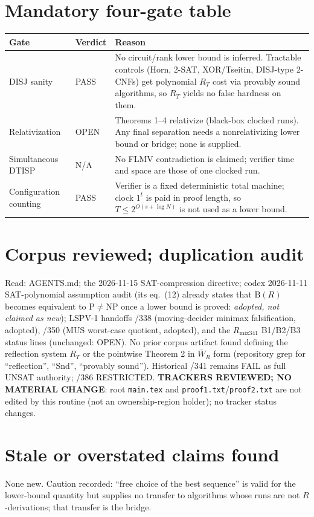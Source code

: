 \documentclass[11pt]{article}
\theoremstyle{definition}
\newcommand{\Wbar}{\overline W}
\begin{document}
\section{Mandatory four-gate table}
\begin{tabular}{p{3.2cm}p{1.6cm}p{9cm}}
\toprule
Gate & Verdict & Reason\\\midrule
DISJ sanity & PASS & No circuit/rank lower bound is inferred. Tractable controls
(Horn, 2-SAT, XOR/Tseitin, DISJ-type 2-CNFs) get polynomial $R_T$ cost via provably
sound algorithms, so $R_T$ yields no false hardness on them.\\
Relativization & OPEN & Theorems 1--4 relativize (black-box clocked runs). Any final
separation needs a nonrelativizing lower bound or bridge; none is supplied.\\
Simultaneous DTISP & N/A & No FLMV contradiction is claimed; verifier time and space
are those of one clocked run.\\
Configuration counting & PASS & Verifier is a fixed deterministic total machine;
clock $1^t$ is paid in proof length, so $T\le 2^{O(s+\log N)}$ is not used as a
lower bound.\\\bottomrule
\end{tabular}

\section*{Corpus reviewed; duplication audit}
Read: AGENTS.md; the 2026-11-15 SAT-compression directive; codex
2026-11-11 SAT-polynomial assumption audit (its eq.\ (12) already states that
$\mathrm B(R)$ becomes equivalent to P$\neq$NP once a lower bound is proved:
\emph{adopted, not claimed as new}); LSPV-1 handoffs /338 (moving-decider minimax
falsification, adopted), /350 (MUS worst-case quotient, adopted), and the
$R_{\mathrm{mix}341}$ B1/B2/B3 status lines (unchanged: OPEN). No prior corpus artifact
found defining the reflection system $R_T$ or the pointwise Theorem 2 in $\Wbar_R$
form (repository grep for ``reflection'', ``Snd'', ``provably sound'').
Historical /341 remains FAIL as full UNSAT authority; /386 RESTRICTED.
\textbf{TRACKERS REVIEWED; NO MATERIAL CHANGE}: root \texttt{main.tex} and
\texttt{proof1.txt}/\texttt{proof2.txt} are not edited by this routine (not an
ownership-region holder); no tracker status changes.

\section*{Stale or overstated claims found}
None new. Caution recorded: ``free choice of the best sequence'' is valid for the
lower-bound quantity but supplies no transfer to algorithms whose runs are not
$R$-derivations; that transfer is the bridge.
\end{document}
